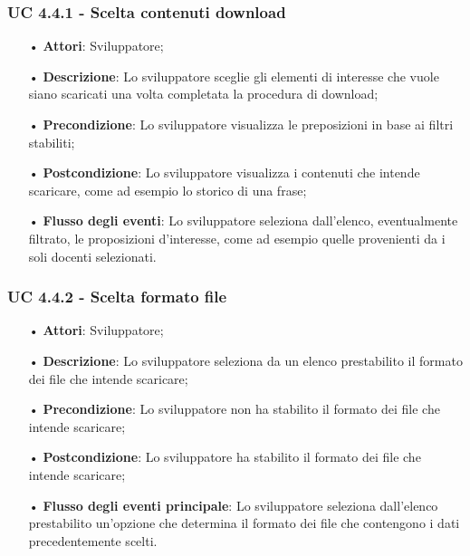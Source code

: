 \subsubsection{UC 4.4.1 - Scelta contenuti download}
\begin{itemize}
\item[•]\textbf{Attori}: Sviluppatore;
\item[•]\textbf{Descrizione}: Lo sviluppatore sceglie gli elementi di interesse che vuole siano scaricati una volta completata la procedura di download;
\item[•]\textbf{Precondizione}: Lo sviluppatore visualizza le preposizioni in base ai filtri stabiliti;
\item[•]\textbf{Postcondizione}:  Lo sviluppatore visualizza i contenuti che intende scaricare, come ad esempio lo storico di una frase;
\item[•]\textbf{Flusso degli eventi}:  Lo sviluppatore seleziona dall'elenco, eventualmente filtrato, le proposizioni d'interesse, come ad esempio quelle provenienti da i soli docenti selezionati.
\end{itemize}

\subsubsection{UC 4.4.2 - Scelta formato file}
\begin{itemize}
\item[•]\textbf{Attori}: Sviluppatore;
\item[•]\textbf{Descrizione}:  Lo sviluppatore seleziona da un elenco prestabilito il formato dei file che intende scaricare;
\item[•]\textbf{Precondizione}: Lo sviluppatore non ha stabilito il formato dei file che intende scaricare;
\item[•]\textbf{Postcondizione}:  Lo sviluppatore ha stabilito il formato dei file che intende scaricare;
\item[•]\textbf{Flusso degli eventi principale}:  Lo sviluppatore seleziona dall'elenco prestabilito un'opzione che determina il formato dei file che contengono i dati precedentemente scelti.
\end{itemize}

